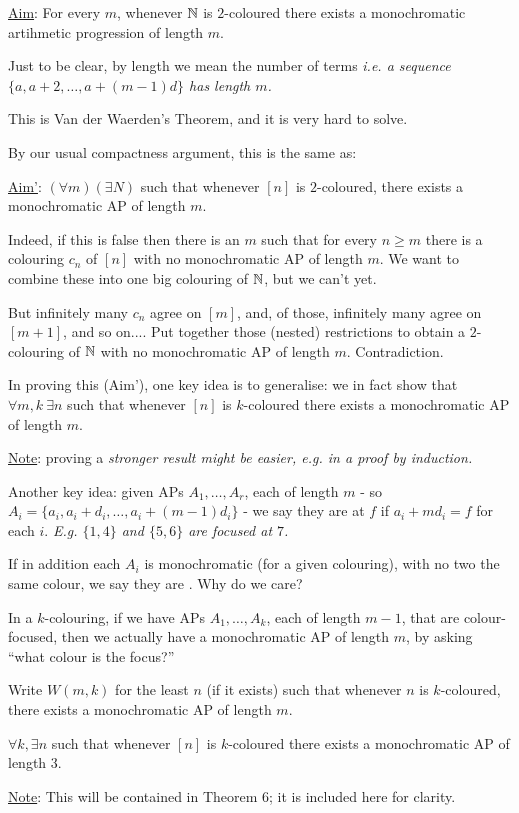\documentclass[10pt]{article}
\begin{document}
\underline{Aim}: For every $m$, whenever $\mathbb{N}$ is $2$-coloured there exists a monochromatic artihmetic progression of length $m$.

Just to be clear, by length we mean the number of terms \it{i.e.} a sequence $\{a, a + 2,\dots, a+(m-1)d\}$ has length $m$.

This is Van der Waerden's Theorem, and it is very hard to solve.

By our usual compactness argument, this is the same as:

\underline{Aim'}: $(\forall m)(\exists N)$ such that whenever $[n]$ is $2$-coloured, there exists a monochromatic AP of length $m$.

Indeed, if this is false then there is an $m$ such that for every $n \ge m$ there is a colouring $c_n$ of $[n]$ with no monochromatic AP of length $m$. We want to combine these into one big colouring of $\mathbb{N}$, but we can't yet.

But infinitely many $c_n$ agree on $[m]$, and, of those, infinitely many agree on $[m+1]$, and so on.... Put together those (nested) restrictions to obtain a $2$-colouring of $\mathbb{N}$ with no monochromatic AP of length $m$. Contradiction.

In proving this (Aim'), one key idea is to generalise: we in fact show that $\forall m,k\ \exists n$ such that whenever $[n]$ is $k$-coloured there exists a monochromatic AP of length $m$.

\underline{Note}: proving a \it{stronger} result might be \it{easier}, \it{e.g.} in a proof by induction.

Another key idea: given APs $A_1,\dots,A_r$, each of length $m$ - so $A_i = \{a_i,a_i+d_i,\dots,a_i+(m-1)d_i\}$ - we say they are  at $f$ if $a_i + md_i = f$ for each $i$. \it{E.g.} $\{1,4\}$ and $\{5,6\}$ are focused at $7$.

If in addition each $A_i$ is monochromatic (for a given colouring), with no two the same colour, we say they are . Why do we care?

In a $k$-colouring, if we have APs $A_1,\dots,A_k$, each of length $m-1$, that are colour-focused, then we actually have a monochromatic AP of length $m$, by asking ``what colour is the focus?''

Write $W(m,k)$ for the least $n$ (if it exists) such that whenever $n$ is $k$-coloured, there exists a monochromatic AP of length $m$.

\begin{prop}
    $\forall k, \exists n$ such that whenever $[n]$ is $k$-coloured there exists a monochromatic AP of length $3$.
\end{prop}
\underline{Note}: This will be contained in Theorem 6; it is included here for clarity.
\end{document}
